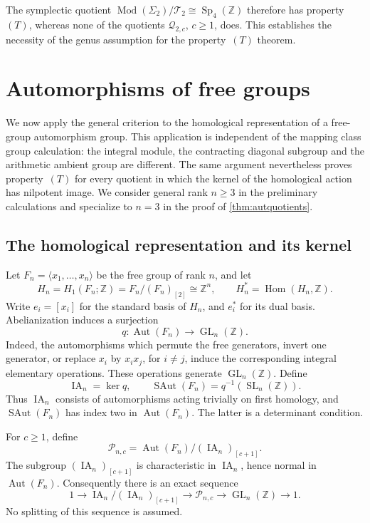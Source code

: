 \documentclass[11pt,a4paper]{article}
\theoremstyle{definition}
\newcommand{\Z}{\mathbb Z}
\newcommand{\Mod}{\operatorname{Mod}}
\newcommand{\Sp}{\operatorname{Sp}}
\newcommand{\SL}{\operatorname{SL}}
\newcommand{\GL}{\operatorname{GL}}
\newcommand{\Aut}{\operatorname{Aut}}
\newcommand{\Hom}{\operatorname{Hom}}
\newcommand{\rt}{(T)}
\begin{document}
The symplectic quotient \(\Mod(\Sigma_2)/\mathcal{T}_2\cong\Sp_4(\Z)\) therefore
has property~\(\rt\), whereas none of the quotients
\(\mathcal{Q}_{2,c}\), \(c\ge1\), does. This establishes the necessity
of the genus assumption for the property~\(\rt\) theorem.

\section{Automorphisms of free groups}
\label{sec:freeautomorphisms}

We now apply the general criterion to the homological representation
of a free-group automorphism group. This application is independent
of the mapping class group calculation: the integral module, the
contracting diagonal subgroup and the arithmetic ambient group are
different. The same argument nevertheless proves property~\(\rt\)
for every quotient in which the kernel of the homological action
has nilpotent image. We consider general rank \(n\ge3\) in the
preliminary calculations and specialize to \(n=3\) in the proof
of \cref{thm:autquotients}.

\subsection{The homological representation and its kernel}

Let \(F_n=\langle x_1,\ldots,x_n\rangle\) be the free group of
rank \(n\), and let
\[
 H_n=H_1(F_n;\Z)=F_n/(F_n)_{[2]}\cong\Z^n,
 \qquad H_n^*=\Hom(H_n,\Z).
\]
Write \(e_i=[x_i]\) for the standard basis of \(H_n\), and
\(e_i^*\) for its dual basis. Abelianization induces a surjection
\[
 q:\Aut(F_n)\longrightarrow\GL_n(\Z).
\]
Indeed, the automorphisms which permute the free generators, invert
one generator, or replace \(x_i\) by \(x_ix_j\), for \(i\ne j\),
induce the corresponding integral elementary operations. These
operations generate \(\GL_n(\Z)\). Define
\[
 \operatorname{IA}_n=\ker q,
 \qquad
 \operatorname{SAut}(F_n)=q^{-1}(\SL_n(\Z)).
\]
Thus \(\operatorname{IA}_n\) consists of automorphisms acting
trivially on first homology, and \(\operatorname{SAut}(F_n)\)
has index two in \(\Aut(F_n)\). The latter is a determinant
condition.

For \(c\ge1\), define
\[
 \mathcal{P}_{n,c}
   =\Aut(F_n)/(\operatorname{IA}_n)_{[c+1]}.
\]
The subgroup \((\operatorname{IA}_n)_{[c+1]}\) is characteristic
in \(\operatorname{IA}_n\), hence normal in \(\Aut(F_n)\).
Consequently there is an exact sequence
\begin{equation}\label{eq:autnilsequence}
 1\longrightarrow
 \operatorname{IA}_n/(\operatorname{IA}_n)_{[c+1]}
 \longrightarrow\mathcal{P}_{n,c}
 \longrightarrow\GL_n(\Z)\longrightarrow1.
\end{equation}
No splitting of this sequence is assumed.
\end{document}
